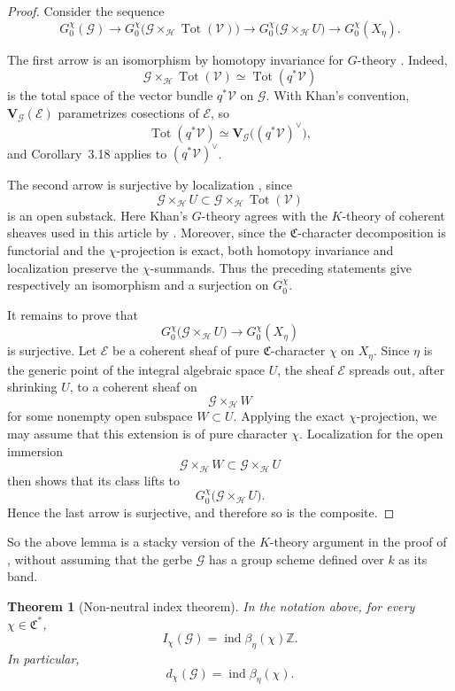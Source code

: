\documentclass[11pt,reqno]{amsart}
\numberwithin{equation}{section}
\theoremstyle{plain}
\newtheorem{theo}[prop]{Theorem}
\theoremstyle{definition}
\def\cG{{\mathcal G}}
\def\cH{{\mathcal H}}
\def\cV{{\mathcal V}}
\def\fC{{\mathfrak C}}
\def\ind{{\operatorname{ind}}}
\def\Tot{{\operatorname{Tot}}}
\begin{document}
\begin{proof}
Consider the sequence
\[
G_0^\chi(\cG)
\rightarrow
G_0^\chi\bigl(\cG\times_{\cH}\Tot(\cV)\bigr)
\rightarrow
G_0^\chi\bigl(\cG\times_{\cH}U\bigr)
\rightarrow
G_0^\chi(X_\eta).
\]

The first arrow is an isomorphism by homotopy invariance for
$G$-theory \cite[Corollary~3.18]{KhanKG}. Indeed,
\[
\cG\times_{\cH}\Tot(\cV)
\simeq
\Tot(q^*\cV)
\]
is the total space of the vector bundle $q^*\cV$ on $\cG$.
With Khan's convention, $\mathbf V_{\cG}(\mathcal E)$ parametrizes
cosections of $\mathcal E$, so
\[
\Tot(q^*\cV)
\simeq
\mathbf V_{\cG}\bigl((q^*\cV)^\vee\bigr),
\]
and Corollary~3.18 applies to $(q^*\cV)^\vee$.

The second arrow is surjective by localization
\cite[Theorem~3.9 and Proposition~3.1]{KhanKG}, since
\[
\cG\times_{\cH}U
\subset
\cG\times_{\cH}\Tot(\cV)
\]
is an open substack. Here Khan's $G$-theory agrees with the
$K$-theory of coherent sheaves used in this article by
\cite[Proposition~3.3]{KhanKG}. Moreover, since the
$\fC$-character decomposition is functorial and the $\chi$-projection
is exact, both homotopy invariance and localization preserve the
$\chi$-summands. Thus the preceding statements give respectively
an isomorphism and a surjection on $G_0^\chi$.

It remains to prove that
\[
G_0^\chi\bigl(\cG\times_{\cH}U\bigr)
\rightarrow
G_0^\chi(X_\eta)
\]
is surjective. Let $\mathcal E$ be a coherent sheaf of pure
$\fC$-character $\chi$ on $X_\eta$. Since $\eta$ is the generic
point of the integral algebraic space $U$, the sheaf $\mathcal E$
spreads out, after shrinking $U$, to a coherent sheaf on
\[
\cG\times_{\cH}W
\]
for some nonempty open subspace $W\subset U$. Applying the exact
$\chi$-projection, we may assume that this extension is of pure
character $\chi$. Localization for the open immersion
\[
\cG\times_{\cH}W
\subset
\cG\times_{\cH}U
\]
then shows that its class lifts to
\[
G_0^\chi\bigl(\cG\times_{\cH}U\bigr).
\]
Hence the last arrow is surjective, and therefore so is the
composite.
\end{proof}

So the above lemma is a stacky version of the $K$-theory argument in the proof of \cite[Theorem~4.4]{KM}, without assuming that the gerbe $\cG$ has a group scheme defined over $k$ as its band. 

\begin{theo}[Non-neutral index theorem]
\label{thm:nonneutral-central-index}
In the notation above, for every $\chi\in\fC^*$,
\begin{equation}\label{eq:rank-ideal-index}
I_\chi(\cG)=\ind\beta_\eta(\chi)\mathbb Z.
\end{equation}
In particular,
\[
d_\chi(\cG)=\ind\beta_\eta(\chi).
\]
\end{theo}
\end{document}
